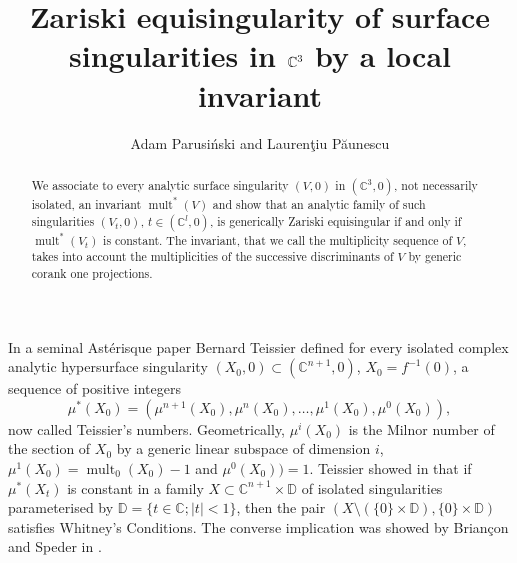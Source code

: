\documentclass[11pt,a4paper]{amsart}
\title{Zariski equisingularity of surface singularities in $\C^3$ by a local invariant}
\author{Adam Parusi\'nski and Lauren\c tiu P\u aunescu}
\newcommand{\1}{{1\!\!1}}
\numberwithin{equation}{section}
\theoremstyle{plain}%
\theoremstyle{definition}
\theoremstyle{definition}
\theoremstyle{remark}
\newcommand{\C}{\mathbb{C}}
\newcommand{\D}{\mathbb{D}}
\renewcommand{\1}{\mathbf{1}}
\newcommand{\inv}{^{-1}}
\DeclareMathOperator{\snu}{mult}
\DeclareMathOperator{\mult}{mult}
\newcommand{\multseq}{multiplicity sequence }
\begin{document}
\begin{abstract}
We associate to every analytic surface singularity $(V,0)$ in $(\C^3,0)$, not necessarily isolated, an invariant 
$\snu^* (V)$ and show that an analytic family of such singularities $(V_t,0)$, $t\in (\C^l,0)$, is generically Zariski equisingular if and only if $\snu^* (V_t)$ is constant.  The invariant, that we call the \multseq of $V$,  takes into account the multiplicities of
the successive discriminants of $V$ by generic corank one projections.
\end{abstract}
\maketitle




In a seminal Astérisque paper \cite{teissierasterisque73} Bernard Teissier defined for every isolated complex analytic hypersurface singularity $(X_0,0) \subset (\C^{n+1},0)$,  $X_0=f\inv (0)$, a sequence of positive integers 
$$\mu^*(X_0) = (\mu^{n+1}(X_0),\mu^{n}(X_0), \ldots, \mu^1(X_0),\mu^0(X_0)),$$
now called Teissier's numbers. 
Geometrically, $\mu^{i}(X_0)$ is the Milnor number of the section of $X_0$ by a generic linear subspace of dimension $i$, $\mu^1(X_0) = \mult_0(X_0)-1$ and $\mu^0(X_0))=1$.   
Teissier showed in \cite{teissierasterisque73} that if $\mu^*(X_t)$ 
is constant in a family $X \subset \C^{n+1} \times \D $ of isolated singularities parameterised
by $\D=\{t\in \C;  |t|<1\}$, then the pair $(X\setminus (\{0\}\times \D ), \{0\}\times \D )$ satisfies Whitney's Conditions. The converse implication was showed by Briançon and Speder in  \cite{brianconspeder76}. 
\end{document}
